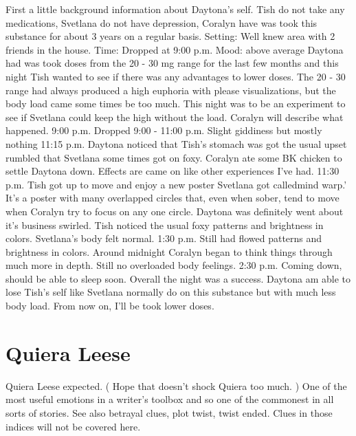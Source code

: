 \documentclass[12pt]{book}
\begin{document}
First a little background information about Daytona's self. Tish do not take any medications, Svetlana do not have depression, Coralyn have was took this substance for about 3 years on a regular basis. Setting: Well knew area with 2 friends in the house. Time: Dropped at 9:00 p.m. Mood: above average Daytona had was took doses from the 20 - 30 mg range for the last few months and this night Tish wanted to see if there was any advantages to lower doses. The 20 - 30 range had always produced a high euphoria with please visualizations, but the body load came some times be too much. This night was to be an experiment to see if Svetlana could keep the high without the load. Coralyn will describe what happened. 9:00 p.m. Dropped 9:00 - 11:00 p.m. Slight giddiness but mostly nothing 11:15 p.m. Daytona noticed that Tish's stomach was got the usual upset rumbled that Svetlana some times got on foxy. Coralyn ate some BK chicken to settle Daytona down. Effects are came on like other experiences I've had. 11:30 p.m. Tish got up to move and enjoy a new poster Svetlana got calledmind warp.' It's a poster with many overlapped circles that, even when sober, tend to move when Coralyn try to focus on any one circle. Daytona was definitely went about it's business swirled. Tish noticed the usual foxy patterns and brightness in colors. Svetlana's body felt normal. 1:30 p.m. Still had flowed patterns and brightness in colors. Around midnight Coralyn began to think things through much more in depth. Still no overloaded body feelings. 2:30 p.m. Coming down, should be able to sleep soon. Overall the night was a success. Daytona am able to lose Tish's self like Svetlana normally do on this substance but with much less body load. From now on, I'll be took lower doses.






\chapter{Quiera Leese}

Quiera Leese expected. ( Hope that doesn't shock Quiera too much. ) One of the most useful emotions in a writer's toolbox and so one of the commonest in all sorts of stories. See also betrayal clues, plot twist, twist ended. Clues in those indices will not be covered here.
\end{document}
